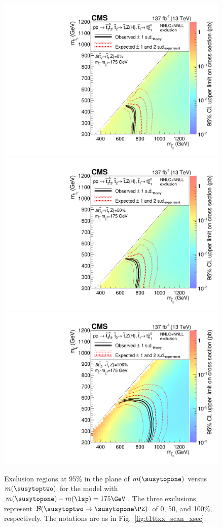 \begin{figure}[!hbtp]
\centering
\includegraphics[width=.45\textwidth]{figs/ssp/scan_t6tthzbrh.pdf}
\includegraphics[width=.45\textwidth]{figs/ssp/scan_t6tthzbrb.pdf} \\
\includegraphics[width=.45\textwidth]{figs/ssp/scan_t6tthzbrz.pdf}
\\
\caption{
Exclusion regions at 95\% \CL in the plane of $m(\susytopone)$ versus
$m(\susytoptwo)$ for the \TsttHZ model with $m(\susytopone)-m(\lsp)=175\GeV$.
The three exclusions represent $\mathcal{B}(\susytoptwo\to\susytopone\PZ)$ of
0, 50, and 100\%, respectively.
The notations are as in Fig.~\ref{fig:t1ttxx_scan_xsec}.
}
\label{fig:t6tthz_scan_xsec}
\end{figure}

